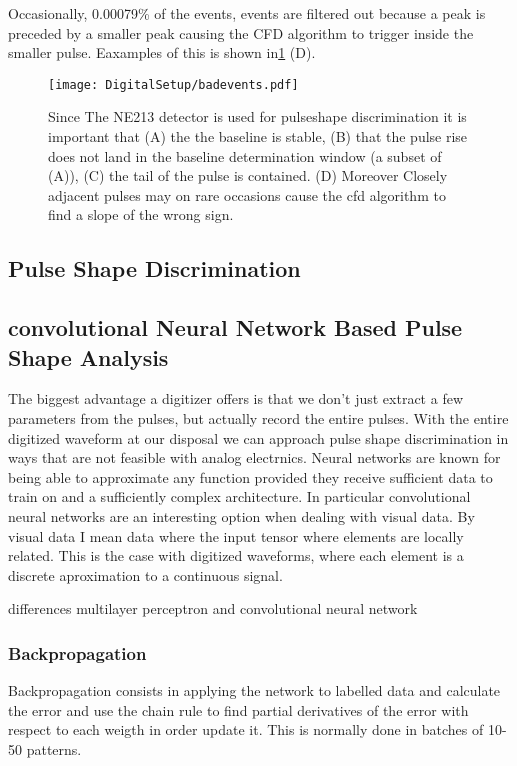 \documentclass[main.tex]{subfiles}
\begin{document}
Occasionally, 0.00079\% of the events, events are filtered out because a peak is preceded by a smaller peak causing the CFD algorithm to trigger inside the smaller pulse. Eaxamples of this is shown in\ref{fig:badevents} (D).
\begin{figure}[ht!]
    \centering
        \texttt{[image: DigitalSetup/badevents.pdf]}
        \caption{Since The NE213 detector is used for pulseshape discrimination it is important that (A) the the baseline is stable, (B) that the pulse rise does not land in the baseline determination window (a subset of (A)), (C) the tail of the pulse is contained. (D) Moreover Closely adjacent pulses may on rare occasions cause the cfd algorithm to find a slope of the wrong sign.}
    \label{fig:badevents} 
\end{figure}

\subsection{Pulse Shape Discrimination}
\subsection{convolutional Neural Network Based Pulse Shape Analysis}
The biggest advantage a digitizer offers is that we don't just extract a few parameters from the pulses, but actually record the entire pulses. With the entire digitized waveform at our disposal we can approach pulse shape discrimination in ways that are not feasible with analog electrnics. Neural networks are known for being able to approximate any function provided they receive sufficient data to train on and a sufficiently complex architecture. In particular convolutional neural networks are an interesting option when dealing with visual data. By visual data I mean data where the input tensor where elements are locally related. This is the case with digitized waveforms, where each element is a discrete aproximation to a continuous signal.

differences multilayer perceptron and convolutional neural network

\subsubsection{Backpropagation}
Backpropagation consists in applying the network to labelled data and calculate the error and use the chain rule to find partial derivatives of the error with respect to each weigth in order update it. This is normally done in batches of 10-50 patterns.
\end{document}
